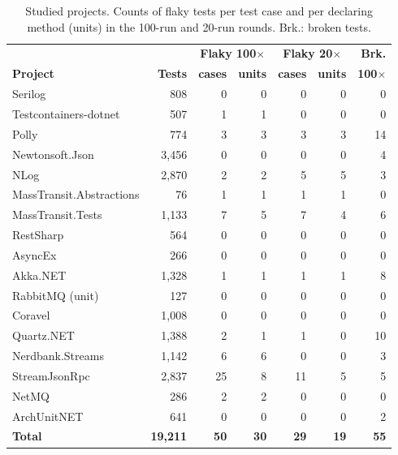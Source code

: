 \begin{table}[!h]
\caption{Studied projects. Counts of flaky tests per test case and per declaring method (units) in the 100-run and 20-run rounds. Brk.: broken tests.}
\label{tab:projetos}
\centering
\scriptsize
\setlength{\tabcolsep}{2.7pt}
\begin{tabular}{@{}lrrrrrr@{}}
\hline\hline
 & & \multicolumn{2}{c}{\textbf{Flaky 100$\times$}} & \multicolumn{2}{c}{\textbf{Flaky 20$\times$}} & \textbf{Brk.} \\
\textbf{Project} & \textbf{Tests} & \textbf{cases} & \textbf{units} & \textbf{cases} & \textbf{units} & \textbf{100$\times$} \\
\hline
Serilog                  &    808 &  0 & 0 &  0 & 0 &  0 \\
Testcontainers-dotnet    &    507 &  1 & 1 &  0 & 0 &  0 \\
Polly                    &    774 &  3 & 3 &  3 & 3 & 14 \\
Newtonsoft.Json          &  3,456 &  0 & 0 &  0 & 0 &  4 \\
NLog                     &  2,870 &  2 & 2 &  5 & 5 &  3 \\
MassTransit.Abstractions &     76 &  1 & 1 &  1 & 1 &  0 \\
MassTransit.Tests        &  1,133 &  7 & 5 &  7 & 4 &  6 \\
RestSharp                &    564 &  0 & 0 &  0 & 0 &  0 \\
AsyncEx                  &    266 &  0 & 0 &  0 & 0 &  0 \\
Akka.NET                 &  1,328 &  1 & 1 &  1 & 1 &  8 \\
RabbitMQ (unit)          &    127 &  0 & 0 &  0 & 0 &  0 \\
Coravel                  &  1,008 &  0 & 0 &  0 & 0 &  0 \\
Quartz.NET               &  1,388 &  2 & 1 &  1 & 0 & 10 \\
Nerdbank.Streams         &  1,142 &  6 & 6 &  0 & 0 &  3 \\
StreamJsonRpc            &  2,837 & 25 & 8 & 11 & 5 &  5 \\
NetMQ                    &    286 &  2 & 2 &  0 & 0 &  0 \\
ArchUnitNET              &    641 &  0 & 0 &  0 & 0 &  2 \\
\hline
\textbf{Total}           & \textbf{19,211} & \textbf{50} & \textbf{30} & \textbf{29} & \textbf{19} & \textbf{55} \\
\hline\hline
\end{tabular}
\end{table}


